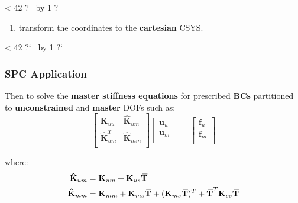 \documentclass[10pt,b5paper,titlepage]{book}
\newcommand{\m}{\mathbf}
\newcommand{\closure}[2][3]{%
{}\mkern#1mu\overline{\mkern-#1mu#2}}
\newcommand{\repeatit}[3][10]{%
    \myloopcounter1%
    \loop\ifnum\myloopcounter < #1
    #2#3%
    \advance\myloopcounter by 1%
    \repeat%
    #2%
}
\newenvironment{qbox}
{
\begin{center}
    \repeatit[42]{?}{\ }
\end{center}
}
{
\begin{center}
    \repeatit[42]{?`}{\ }
\end{center}
}
\newenvironment{eqarray}
{
    \begin{eqnarray}
        \begin{aligned}
}
{
        \end{aligned}
    \end{eqnarray}
}
\begin{document}
\begin{qbox}
\begin{enumerate}
            When the cylindrical CSYS is defined by three points - \textbf{origin}
            $ \m{x}_O^c $, point on \textbf{r-axis} $ \m{x}_{R}^c $
            and a point in \textbf{rz-plane} $ \m{x}_{RZ}^c $, then:

            \begin{equation}
                \vec{\m{r}} = \m{x}_R^c - \m{x}_O^c
            \end{equation}

            \begin{equation}
                \m{\closure{x}}_{OR}^c = \frac{\m{x}_{OR}^c}{|| \m{x}_{OR}^c ||}
            \end{equation}

        \item transform the coordinates to the \textbf{cartesian} CSYS.

    \end{enumerate}

\end{qbox}



\subsubsection{SPC Application}

Then to solve the \textbf{master stiffness equations} for prescribed \textbf{BCs}
partitioned to \textbf{unconstrained} and \textbf{master} DOFs such as:
\begin{equation}
    \begin{bmatrix}
        \m{K}_{uu} & \m{\hat{K}}_{um} \\
        \m{\hat{K}}_{um}^T & \m{\hat{K}}_{mm} \\
    \end{bmatrix}
    \begin{bmatrix}
        \m{u}_u \\
        \m{u}_m \\
    \end{bmatrix}
    = \begin{bmatrix}
        \m{f}_{u} \\
        \m{f}_m \\
    \end{bmatrix}
\end{equation}

where:
\begin{eqarray}
    \m{\hat{K}}_{um} &= \m{K}_{um} + \m{K}_{us} \m{\closure{T}} \\
    \m{\hat{K}}_{mm} &= \m{K}_{mm} + \m{K}_{ms} \m{\closure{T}}
                      + (\m{K}_{ms} \m{\closure{T}})^T
                      + \m{\closure{T}}^T \m{K}_{ss} \m{\closure{T}}
\end{eqarray}
\end{document}
